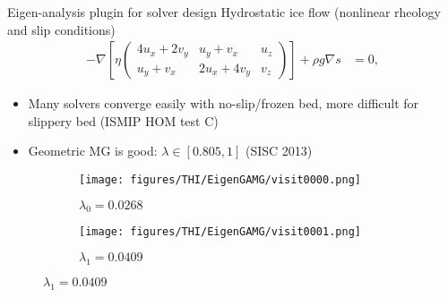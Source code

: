 \begin{frame}{Eigen-analysis plugin for solver design}
  Hydrostatic ice flow (nonlinear rheology and slip conditions)
  \begin{align}\label{eq:momentum}
    - \nabla \left[ \eta
      \begin{pmatrix}
        4 u_x + 2 v_y & u_y + v_x & u_z \\
        u_y + v_x & 2 u_x + 4 v_y & v_z
      \end{pmatrix} \right] + \rho g \nabla s & = 0,
  \end{align}
  \begin{itemize}
  \item Many solvers converge easily with no-slip/frozen bed, more difficult for slippery bed (ISMIP HOM test C)
  \item Geometric MG is good: $\lambda \in [0.805, 1]$ (SISC 2013)
  \end{itemize}
  \vspace{-1ex}
  \begin{figure}
    \centering
    \begin{subfigure}{0.4\textwidth}
      \centering
      \texttt{[image: figures/THI/EigenGAMG/visit0000.png]}
      \caption{$\lambda_0 = 0.0268$}
    \end{subfigure}
    \begin{subfigure}{0.4\textwidth}
      \centering
      \texttt{[image: figures/THI/EigenGAMG/visit0001.png]}
      \caption{$\lambda_1 = 0.0409$}
    \end{subfigure}
  \end{figure}
\end{frame}
